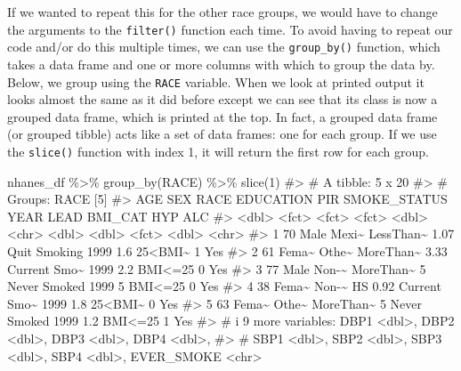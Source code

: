 \documentclass[
  letterpaper,
]{krantz}
\makeatletter
\newenvironment{Shaded}{\begin{snugshade}}{\end{snugshade}}
\newcommand{\CommentTok}[1]{\textcolor[rgb]{0.37,0.37,0.37}{#1}}
\newcommand{\DecValTok}[1]{\textcolor[rgb]{0.68,0.00,0.00}{#1}}
\newcommand{\FunctionTok}[1]{\textcolor[rgb]{0.28,0.35,0.67}{#1}}
\newcommand{\NormalTok}[1]{\textcolor[rgb]{0.00,0.23,0.31}{#1}}
\newcommand{\SpecialCharTok}[1]{\textcolor[rgb]{0.37,0.37,0.37}{#1}}
\newenvironment{kframe}{%
\medskip{}
\setlength{\fboxsep}{.8em}
 \def\at@end@of@kframe{}%
 \ifinner\ifhmode%
  \def\at@end@of@kframe{\end{minipage}}%
  \begin{minipage}{\columnwidth}%
 \fi\fi%
 \def\FrameCommand##1{\hskip\@totalleftmargin \hskip-\fboxsep
 \colorbox{shadecolor}{##1}\hskip-\fboxsep
     \hskip-\linewidth \hskip-\@totalleftmargin \hskip\columnwidth}%
 \MakeFramed {\advance\hsize-\width
   \@totalleftmargin\z@ \linewidth\hsize
   \@setminipage}}%
 {\par\unskip\endMakeFramed%
 \at@end@of@kframe}
\renewenvironment{Shaded}{\begin{kframe}}{\end{kframe}}
\makeatother
\begin{document}
If we wanted to repeat this for the other race groups, we would have to
change the arguments to the \texttt{filter()} function each time. To
avoid having to repeat our code and/or do this multiple times, we can
use the \texttt{group\_by()} function, which takes a data frame and one
or more columns with which to group the data by. Below, we group using
the \texttt{RACE} variable. When we look at printed output it looks
almost the same as it did before except we can see that its class is now
a grouped data frame, which is printed at the top. In fact, a grouped
data frame (or grouped tibble) acts like a set of data frames: one for
each group. If we use the \texttt{slice()} function with index 1, it
will return the first row for each group.

\begin{Shaded}
\begin{Highlighting}[]
\NormalTok{nhanes\_df }\SpecialCharTok{\%\textgreater{}\%} 
  \FunctionTok{group\_by}\NormalTok{(RACE) }\SpecialCharTok{\%\textgreater{}\%}
  \FunctionTok{slice}\NormalTok{(}\DecValTok{1}\NormalTok{)}
\CommentTok{\#\textgreater{} \# A tibble: 5 x 20}
\CommentTok{\#\textgreater{} \# Groups:   RACE [5]}
\CommentTok{\#\textgreater{}     AGE SEX   RACE  EDUCATION   PIR SMOKE\_STATUS  YEAR  LEAD BMI\_CAT   HYP ALC  }
\CommentTok{\#\textgreater{}   \textless{}dbl\textgreater{} \textless{}fct\textgreater{} \textless{}fct\textgreater{} \textless{}fct\textgreater{}     \textless{}dbl\textgreater{} \textless{}chr\textgreater{}        \textless{}dbl\textgreater{} \textless{}dbl\textgreater{} \textless{}fct\textgreater{}   \textless{}dbl\textgreater{} \textless{}chr\textgreater{}}
\CommentTok{\#\textgreater{} 1    70 Male  Mexi\textasciitilde{} LessThan\textasciitilde{}  1.07 Quit Smoking  1999   1.6 25\textless{}BMI\textasciitilde{}     1 Yes  }
\CommentTok{\#\textgreater{} 2    61 Fema\textasciitilde{} Othe\textasciitilde{} MoreThan\textasciitilde{}  3.33 Current Smo\textasciitilde{}  1999   2.2 BMI\textless{}=25     0 Yes  }
\CommentTok{\#\textgreater{} 3    77 Male  Non{-}\textasciitilde{} MoreThan\textasciitilde{}  5    Never Smoked  1999   5   BMI\textless{}=25     0 Yes  }
\CommentTok{\#\textgreater{} 4    38 Fema\textasciitilde{} Non{-}\textasciitilde{} HS         0.92 Current Smo\textasciitilde{}  1999   1.8 25\textless{}BMI\textasciitilde{}     0 Yes  }
\CommentTok{\#\textgreater{} 5    63 Fema\textasciitilde{} Othe\textasciitilde{} MoreThan\textasciitilde{}  5    Never Smoked  1999   1.2 BMI\textless{}=25     1 Yes  }
\CommentTok{\#\textgreater{} \# i 9 more variables: DBP1 \textless{}dbl\textgreater{}, DBP2 \textless{}dbl\textgreater{}, DBP3 \textless{}dbl\textgreater{}, DBP4 \textless{}dbl\textgreater{},}
\CommentTok{\#\textgreater{} \#   SBP1 \textless{}dbl\textgreater{}, SBP2 \textless{}dbl\textgreater{}, SBP3 \textless{}dbl\textgreater{}, SBP4 \textless{}dbl\textgreater{}, EVER\_SMOKE \textless{}chr\textgreater{}}
\end{Highlighting}
\end{Shaded}
\end{document}
